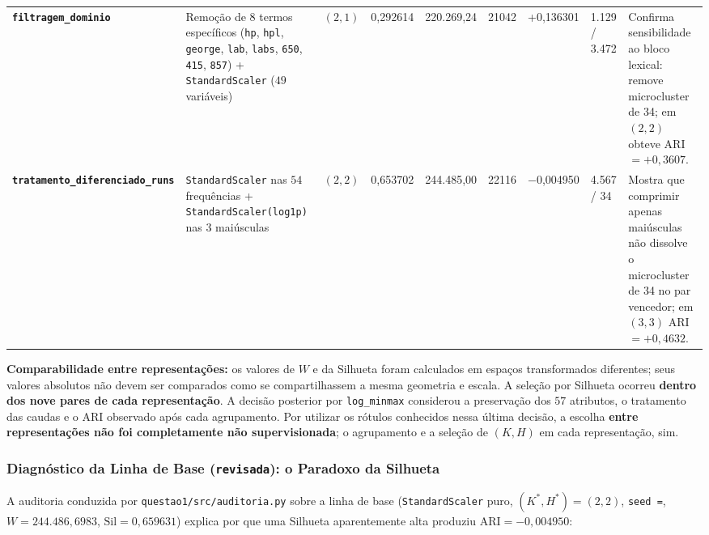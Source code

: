 \documentclass[a4paper,11pt]{article}
\begin{document}
\begin{center}
\begin{minipage}{\linewidth}
\begin{tabularx}{\linewidth}{P{1.90cm} >{\hsize}L Q{0.92cm} Q{1.30cm} R{1.34cm} Q{0.82cm} R{1.38cm} Q{1.56cm} >{\hsize}L}
\textbf{\texttt{filtragem\_\allowbreak dominio}} & Remoção de $8$ termos específicos (\texttt{hp}, \texttt{hpl}, \texttt{george}, \texttt{lab}, \texttt{labs}, \texttt{650}, \texttt{415}, \texttt{857}) + \texttt{StandardScaler} ($49$ variáveis) & $(2, 1)$ & 0,292614 & 220.269,24 & 21042 & +0,136301 & 1.129 / 3.472 & Confirma sensibilidade ao bloco lexical: remove microcluster de 34; em $(2,2)$ obteve ARI $= +0,3607$. \\
\textbf{\texttt{tratamento\_\allowbreak diferenciado\_\allowbreak runs}} & \texttt{StandardScaler} nas $54$ frequências + \texttt{StandardScaler(\allowbreak log1p)} nas $3$ maiúsculas & $(2, 2)$ & 0,653702 & 244.485,00 & 22116 & $-$0,004950 & 4.567 / 34 & Mostra que comprimir apenas maiúsculas não dissolve o microcluster de 34 no par vencedor; em $(3,3)$ ARI $= +0,4632$. \\
\bottomrule
\end{tabularx}
\end{minipage}
\end{center}


\begin{center}
\colorbox{notebg}{\parbox{\dimexpr\linewidth-2\fboxsep\relax}{\small \textbf{Comparabilidade entre representações:} os valores de $W$ e da Silhueta foram calculados em espaços transformados diferentes; seus valores absolutos não devem ser comparados como se compartilhassem a mesma geometria e escala. A seleção por Silhueta ocorreu \textbf{dentro dos nove pares de cada representação}. A decisão posterior por \texttt{log\_\allowbreak minmax} considerou a preservação dos $57$ atributos, o tratamento das caudas e o ARI observado após cada agrupamento. Por utilizar os rótulos conhecidos nessa última decisão, a escolha \textbf{entre representações não foi completamente não supervisionada}; o agrupamento e a seleção de $(K,H)$ em cada representação, sim.}}
\end{center}


\subsubsection{\texorpdfstring{Diagnóstico da Linha de Base (\texttt{revisada}): o Paradoxo da Silhueta}{Diagnóstico da Linha de Base (revisada): o Paradoxo da Silhueta}}\label{sec:2-1-4-diagnostico-da-linha-de-base-revisada-o-paradoxo-da-silhueta}


A auditoria conduzida por \texttt{questao1/\allowbreak src/\allowbreak auditoria.py} sobre a linha de base (\texttt{StandardScaler} puro, $(K^*, H^*) = (2,2)$, \texttt{seed =}, $W = 244.486,6983$, $\text{Sil} = 0,659631$) explica por que uma Silhueta aparentemente alta produziu $\text{ARI} = -0,004950$:
\end{document}
